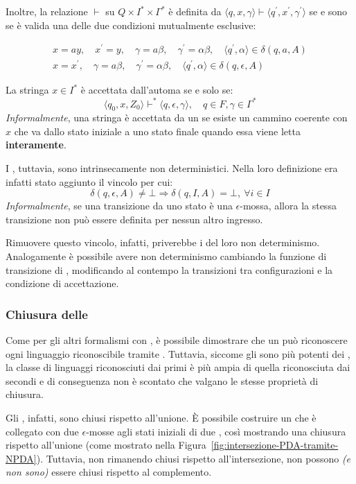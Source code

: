 \documentclass[italian, 10pt]{article}
\begin{document}
Inoltre, la relazione \(\vdash\) su \(Q \times I^\ast \times \Gamma^\ast\) è definita da \(\langle q, x, \gamma \rangle \vdash \langle q^\prime, x^\prime, \gamma^\prime \rangle\) se e sono se è valida una delle due condizioni mutualmente esclusive:

\begin{gather}
  x = ay,\quad x^\prime = y,\quad \gamma = a \beta,\quad \gamma^\prime = \alpha\beta,\quad \langle q^\prime, \alpha \rangle \in \delta(q, a, A) \\
  x = x^\prime,\quad \gamma = a \beta,\quad \gamma^\prime = \alpha\beta,\quad \langle q^\prime, \alpha \rangle \in \delta(q, \epsilon, A)
\end{gather}

\bigskip
La stringa \(x \in I^\ast\) è accettata dall'automa se e solo se:
\[ \langle q_0, x, Z_0 \rangle \vdash^\ast \langle q, \epsilon, \gamma \rangle, \quad q \in F, \gamma \in \Gamma^\ast \]
\textit{Informalmente}, una stringa è accettata da un \NPDA se esiste un cammino coerente con \(x\) che va dallo stato iniziale a uno stato finale quando essa viene letta \textbf{interamente}.

\bigskip
I \PDA, tuttavia, sono intrinsecamente non deterministici.
Nella loro definizione era infatti stato aggiunto il vincolo per cui:
\[ \delta(q, \epsilon, A) \neq \bot \Rightarrow \delta(q, I, A)=\bot, \ \forall i \in I \]
\textit{Informalmente}, se una transizione da uno stato è  una \(\epsilon\)-mossa, allora la stessa transizione non può essere definita per nessun altro ingresso.

Rimuovere questo vincolo, infatti, priverebbe i \PDA del loro non determinismo.
Analogamente è possibile avere non determinismo cambiando la funzione di transizione di \PDA, modificando al contempo la transizioni tra configurazioni e la condizione di accettazione.

\subsubsection{Chiusura delle \NPDA}

Come per gli altri formalismi con \ND, è possibile dimostrare che un \NPDA può riconoscere ogni linguaggio riconoscibile tramite \DPDA.
Tuttavia, siccome gli \NPDA sono più potenti dei \DPDA, la classe di linguaggi riconosciuti dai primi è più ampia di quella riconosciuta dai secondi e di conseguenza non è scontato che valgano le stesse proprietà di chiusura.

Gli \NPDA, infatti, sono chiusi rispetto all'unione.
È possibile costruire un \NPDA che è collegato con due \(\epsilon\)-mosse agli stati iniziali di due \DPDA, così mostrando una chiusura rispetto all'unione (come mostrato nella Figura~\ref{fig:intersezione-PDA-tramite-NPDA}).
Tuttavia, non rimanendo chiusi rispetto all'intersezione, non possono \textit{(e non sono)} essere chiusi rispetto al complemento.
\end{document}
